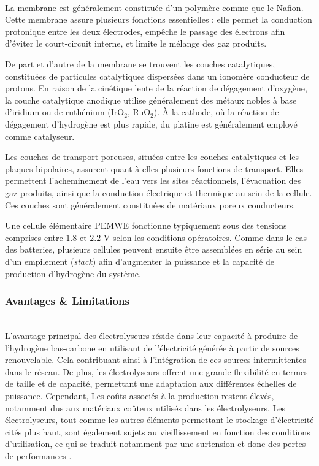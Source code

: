 La membrane est généralement constituée d'un polymère comme que le Nafion\textsuperscript{\textregistered}. Cette membrane assure plusieurs fonctions essentielles : elle permet la conduction protonique entre les deux électrodes, empêche le passage des électrons afin d'éviter le court-circuit interne, et limite le mélange des gaz produits. 

De part et d'autre de la membrane se trouvent les couches catalytiques, constituées de particules catalytiques dispersées dans un ionomère conducteur de protons. En raison de la cinétique lente de la réaction de dégagement d'oxygène, la couche catalytique anodique utilise généralement des métaux nobles à base d'iridium ou de ruthénium (IrO$_2$, RuO$_2$). À la cathode, où la réaction de dégagement d'hydrogène est plus rapide, du platine est généralement employé comme catalyseur.

Les couches de transport poreuses, situées entre les couches catalytiques et les plaques bipolaires, assurent quant à elles plusieurs fonctions de transport. Elles permettent l'acheminement de l'eau vers les sites réactionnels, l'évacuation des gaz produits, ainsi que la conduction électrique et thermique au sein de la cellule. Ces couches sont généralement constituées de matériaux poreux conducteurs. 

Une cellule élémentaire PEMWE fonctionne typiquement sous des tensions comprises entre \(1.8\) et \(2.2\) V selon les conditions opératoires. Comme dans le cas des batteries, plusieurs cellules peuvent ensuite être assemblées en série au sein d'un empilement (\textit{stack}) afin d'augmenter la puissance et la capacité de production d'hydrogène du système.

\subsubsection{Avantages \& Limitations}\hfill \\
L'avantage principal des électrolyseurs réside dans leur capacité à produire de l'hydrogène bas-carbone en utilisant de l'électricité générée à partir de sources renouvelable. Cela contribuant ainsi à l'intégration de ces sources intermittentes dans le réseau. De plus, les électrolyseurs offrent une grande flexibilité en termes de taille et de capacité, permettant une adaptation aux différentes échelles de puissance.
Cependant, Les coûts associés à la production restent élevés, notamment dus aux matériaux coûteux utilisés dans les électrolyseurs. Les électrolyseurs, tout comme les autres éléments permettant le stockage d'électricité cités plus haut, sont également sujets au vieillissement en fonction des conditions d'utilisation, ce qui se traduit notamment par une surtension et donc des pertes de performances \cite{papakonstantinou_degradation_2020}\cite{weis_impact_2019}.


